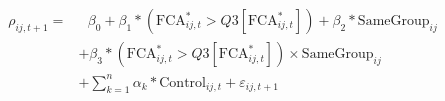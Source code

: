 \begin{equation}
\begin{split}
\rho_{ij,t+1} = & \text{ 	}\beta_0 + \beta_1* (\text{FCA}^*_{ij,t} > Q3[\text{FCA}^*_{ij,t}])  + \beta_2 * \text{SameGroup}_{ij}  \\
& +  \beta_3* (\text{FCA}^*_{ij,t} > Q3[\text{FCA}^*_{ij,t}]) \times \text{SameGroup}_{ij}   \\
  & + \sum_{k=1} ^{n} \alpha_k*\text{Control}_{ij,t} + \varepsilon_{ij,t+1}
\end{split}
\label{model2}
\end{equation}
